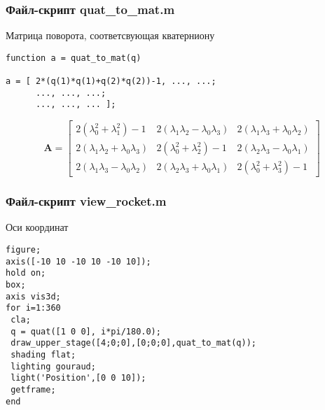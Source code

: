 \documentclass[12pt, compress]{beamer}
\renewcommand{\emph}[1]{\textcolor{dark-blue}{#1}}
\begin{document}
\begin{frame}[c, fragile]
\frametitle{Файл-скрипт \emph{quat\_to\_mat.m}}
Матрица поворота, соответсвующая кватерниону  
\begin{lstlisting}
function a = quat_to_mat(q)

a = [ 2*(q(1)*q(1)+q(2)*q(2))-1, ..., ...;
      ..., ..., ...;
      ..., ..., ... ];

\end{lstlisting}
\begin{equation*}
  \boldsymbol A = 
\begin{bmatrix}
2(\lambda_0^2+\lambda_1^2)-1 & 2(\lambda_1 \lambda_2 - \lambda_0 \lambda_3)  & 2(\lambda_1 \lambda_3 + \lambda_0 \lambda_2) \\
2(\lambda_1 \lambda_2 + \lambda_0 \lambda_3) & 2(\lambda_0^2 + \lambda_2^2) - 1 & 2(\lambda_2 \lambda_3 - \lambda_0 \lambda_1) \\
2 (\lambda_1\lambda_3-\lambda_0\lambda_2) & 2(\lambda_2\lambda_3+\lambda_0\lambda_1) &   2(\lambda_0^2 + \lambda_3^2) - 1
\end{bmatrix}
\end{equation*} 
\end{frame}

\begin{frame}[c, fragile]
\frametitle{Файл-скрипт \emph{view\_rocket.m}}
Оси координат
\begin{lstlisting}
figure;
axis([-10 10 -10 10 -10 10]);
hold on;
box;
axis vis3d;
for i=1:360
 cla;
 q = quat([1 0 0], i*pi/180.0);
 draw_upper_stage([4;0;0],[0;0;0],quat_to_mat(q));
 shading flat;
 lighting gouraud;
 light('Position',[0 0 10]);
 getframe;
end
\end{lstlisting}
\end{frame}
\end{document}
